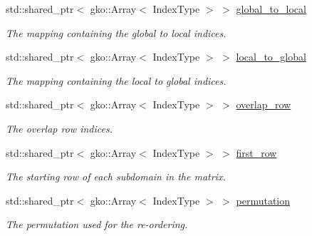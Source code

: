 \begin{DoxyCompactItemize}
\mbox{\label{structschwz_1_1Metadata_a0ad24ef496c5e99cb0c5c2e8af3a1fab}} 
std\+::shared\+\_\+ptr$<$ gko\+::\+Array$<$ Index\+Type $>$ $>$ \hyperlink{structschwz_1_1Metadata_a0ad24ef496c5e99cb0c5c2e8af3a1fab}{global\+\_\+to\+\_\+local}
\begin{DoxyCompactList}\small\item\em The mapping containing the global to local indices. \end{DoxyCompactList}\item 
\mbox{\label{structschwz_1_1Metadata_acadbecaaeb439bc25e079a595fb084fa}} 
std\+::shared\+\_\+ptr$<$ gko\+::\+Array$<$ Index\+Type $>$ $>$ \hyperlink{structschwz_1_1Metadata_acadbecaaeb439bc25e079a595fb084fa}{local\+\_\+to\+\_\+global}
\begin{DoxyCompactList}\small\item\em The mapping containing the local to global indices. \end{DoxyCompactList}\item 
\mbox{\label{structschwz_1_1Metadata_a4637081afa35e53f7fab1b58b7ec760f}} 
std\+::shared\+\_\+ptr$<$ gko\+::\+Array$<$ Index\+Type $>$ $>$ \hyperlink{structschwz_1_1Metadata_a4637081afa35e53f7fab1b58b7ec760f}{overlap\+\_\+row}
\begin{DoxyCompactList}\small\item\em The overlap row indices. \end{DoxyCompactList}\item 
\mbox{\label{structschwz_1_1Metadata_a7720eefa9814e5a4db0d8705a1cf756f}} 
std\+::shared\+\_\+ptr$<$ gko\+::\+Array$<$ Index\+Type $>$ $>$ \hyperlink{structschwz_1_1Metadata_a7720eefa9814e5a4db0d8705a1cf756f}{first\+\_\+row}
\begin{DoxyCompactList}\small\item\em The starting row of each subdomain in the matrix. \end{DoxyCompactList}\item 
\mbox{\label{structschwz_1_1Metadata_af7361fcd600b3051619ce6e40770febc}} 
std\+::shared\+\_\+ptr$<$ gko\+::\+Array$<$ Index\+Type $>$ $>$ \hyperlink{structschwz_1_1Metadata_af7361fcd600b3051619ce6e40770febc}{permutation}
\begin{DoxyCompactList}\small\item\em The permutation used for the re-\/ordering. \end{DoxyCompactList}\item 

\end{DoxyCompactItemize}
